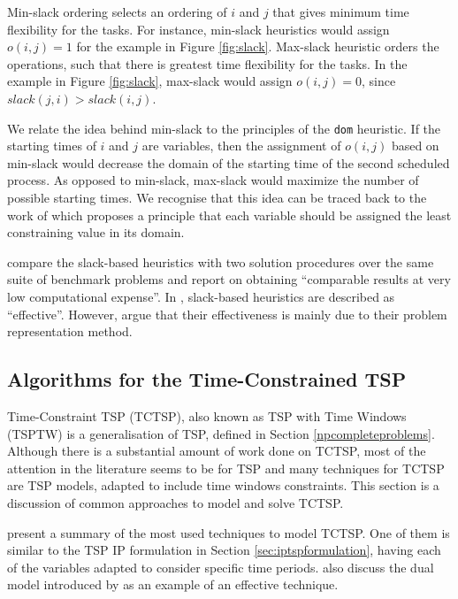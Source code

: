 \documentclass{mprop}
\theoremstyle{definition}
\begin{document}
Min-slack ordering selects an ordering of $i$ and $j$ that gives minimum time flexibility for the tasks. For instance, min-slack heuristics would assign $o(i,j) = 1$ for the example in Figure \ref{fig:slack}.
Max-slack heuristic orders the operations, such that there is greatest time flexibility for the tasks. In the example in Figure \ref{fig:slack}, max-slack would assign $o(i,j) = 0$, since $slack(j, i) > slack(i, j)$.

We relate the idea behind min-slack to the principles of the \texttt{dom} heuristic. If the starting times of $i$ and $j$ are variables, then the assignment of $o(i,j)$ based on min-slack would decrease the domain of the starting time of the second scheduled process. As opposed to min-slack, max-slack would maximize the number of possible starting times. We recognise that this idea can be traced back to the work of \citet{Geelen92} which proposes a principle that each variable should be assigned the least constraining value in its domain.

\citet{Smith93} compare the slack-based heuristics with two solution procedures over the same suite of benchmark problems and report on obtaining ``comparable results at very low computational expense''. In \citet[p.~105]{cpbible}, slack-based heuristics are described as ``effective''. However, \citet{Crawford94} argue that their effectiveness is mainly due to their problem representation method.

\subsection{Algorithms for the Time-Constrained TSP}
\label{sec:tctspalgos}
Time-Constraint TSP (TCTSP), also known as TSP with Time Windows (TSPTW) is a generalisation of TSP, defined in Section \ref{npcompleteproblems}.
Although there is a substantial amount of work done on TCTSP, most of the attention in the literature seems to be for TSP \citep{tspbible} and many techniques for TCTSP are TSP models, adapted to include time windows constraints. This section is a discussion of common approaches to model and solve TCTSP.

\citet{tspbible} present a summary of the most used techniques to model TCTSP. One of them is similar to the TSP IP formulation in Section \ref{sec:iptspformulation}, having each of the variables adapted to consider specific time periods. \citet{tspbible} also discuss the dual model introduced by \citet{Baker83} as an example of an effective technique.
\end{document}
